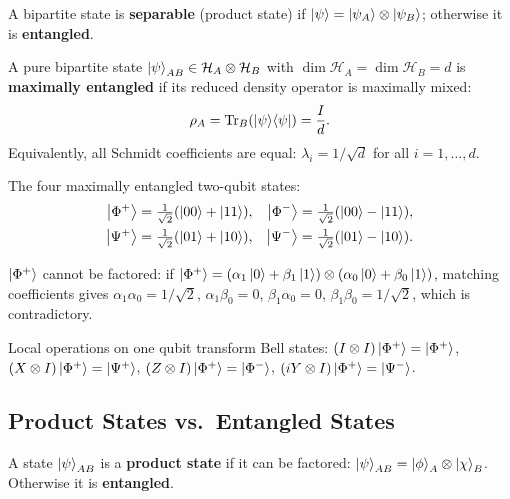 \documentclass[10pt,a4paper]{article}
\begin{document}
\begin{tcolorbox}[defstyle, title={Definition: Separable and Entangled States}]
A bipartite state is \textbf{separable} (product state) if $\ket{\psi}=\ket{\psi_A}\otimes\ket{\psi_B}$; otherwise it is \textbf{entangled}.
\end{tcolorbox}

\begin{tcolorbox}[defstyle, title={Definition: Maximally Entangled State}]
A pure bipartite state $\ket{\psi}_{AB}\in\mathcal{H}_A\otimes\mathcal{H}_B$ with $\dim\mathcal{H}_A=\dim\mathcal{H}_B=d$ is \textbf{maximally entangled} if its reduced density operator is maximally mixed:
\[
\rho_A = \mathrm{Tr}_B\!\left(\ket{\psi}\!\bra{\psi}\right) = \frac{I}{d}.
\]
Equivalently, all Schmidt coefficients are equal: $\lambda_i=1/\sqrt{d}$ for all $i=1,\dots,d$.
\end{tcolorbox}

\begin{tcolorbox}[defstyle, title={Definition: Bell States (EPR Pairs)}]
The four maximally entangled two-qubit states:
\begin{align*}
\ket{\Phi^+}&=\tfrac{1}{\sqrt{2}}(\ket{00}+\ket{11}), & \ket{\Phi^-}&=\tfrac{1}{\sqrt{2}}(\ket{00}-\ket{11}),\\
\ket{\Psi^+}&=\tfrac{1}{\sqrt{2}}(\ket{01}+\ket{10}), & \ket{\Psi^-}&=\tfrac{1}{\sqrt{2}}(\ket{01}-\ket{10}).
\end{align*}
\end{tcolorbox}
$\ket{\Phi^+}$ cannot be factored: if $\ket{\Phi^+}=(\alpha_1\ket{0}+\beta_1\ket{1})\otimes(\alpha_0\ket{0}+\beta_0\ket{1})$, matching coefficients gives $\alpha_1\alpha_0=1/\sqrt{2}$, $\alpha_1\beta_0=0$, $\beta_1\alpha_0=0$, $\beta_1\beta_0=1/\sqrt{2}$, which is contradictory.

Local operations on one qubit transform Bell states: $(I\otimes I)\ket{\Phi^+}=\ket{\Phi^+}$, $(X\otimes I)\ket{\Phi^+}=\ket{\Psi^+}$, $(Z\otimes I)\ket{\Phi^+}=\ket{\Phi^-}$, $(iY\otimes I)\ket{\Phi^+}=\ket{\Psi^-}$.

\subsection{Product States vs.\ Entangled States}

\begin{tcolorbox}[defstyle, title={Definition: Product (Separable) States}]
A state $\ket{\psi}_{AB}$ is a \textbf{product state} if it can be factored: $\ket{\psi}_{AB}=\ket{\phi}_A\otimes\ket{\chi}_B$. Otherwise it is \textbf{entangled}.
\end{tcolorbox}
\end{document}

